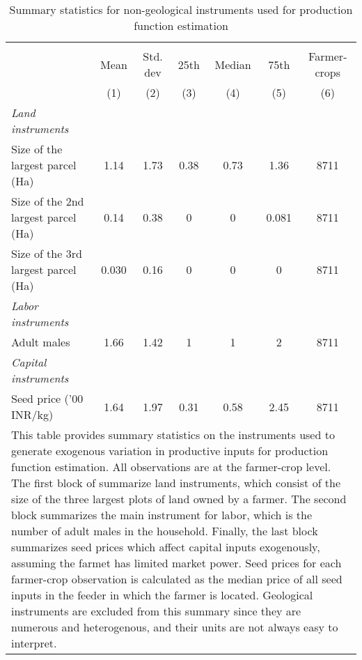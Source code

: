 \begin{table}[htbp]\centering
\def\sym#1{\ifmmode^{#1}\else\(^{#1}\)\fi}
\caption{Summary statistics for non-geological instruments used for production function estimation}
\begin{tabular*}{1.0\hsize}{@{\hskip\tabcolsep\extracolsep\fill}l*{1}{cccccc}}
\toprule
                                    &\multicolumn{6}{c}{}                                                         \\
                                    &        Mean&    Std. dev&        25th&      Median&        75th&Farmer-crops\\
&\multicolumn{1}{c}{(1)}&\multicolumn{1}{c}{(2)}&\multicolumn{1}{c}{(3)}&\multicolumn{1}{c}{(4)}&\multicolumn{1}{c}{(5)}&\multicolumn{1}{c}{(6)}\\
\midrule
\emph{Land instruments}             &            &            &            &            &            &            \\
Size of the largest parcel (Ha)     &        1.14&        1.73&        0.38&        0.73&        1.36&        8711\\
Size of the 2nd largest parcel (Ha) &        0.14&        0.38&           0&           0&       0.081&        8711\\
Size of the 3rd largest parcel (Ha) &       0.030&        0.16&           0&           0&           0&        8711\\
\emph{Labor instruments}            &            &            &            &            &            &            \\
Adult males                         &        1.66&        1.42&           1&           1&           2&        8711\\
\emph{Capital instruments}          &            &            &            &            &            &            \\
Seed price ('00 INR/kg)             &        1.64&        1.97&        0.31&        0.58&        2.45&        8711\\
\bottomrule
\multicolumn{7}{l}{\footnotesize This table provides summary statistics on the instruments used to generate exogenous variation in productive inputs for production function estimation. All observations are at the farmer-crop level. The first block of summarize land instruments, which consist of the size of the three largest plots of land owned by a farmer. The second block summarizes the main instrument for labor, which is the number of adult males in the household. Finally, the last block summarizes seed prices which affect capital inputs exogenously, assuming the farmet has limited market power. Seed prices for each farmer-crop observation is calculated as the median price of all seed inputs in the feeder in which the farmer is located. Geological instruments are excluded from this summary since they are numerous and heterogenous, and their units are not always easy to interpret.}\\
\end{tabular*}
\end{table}
